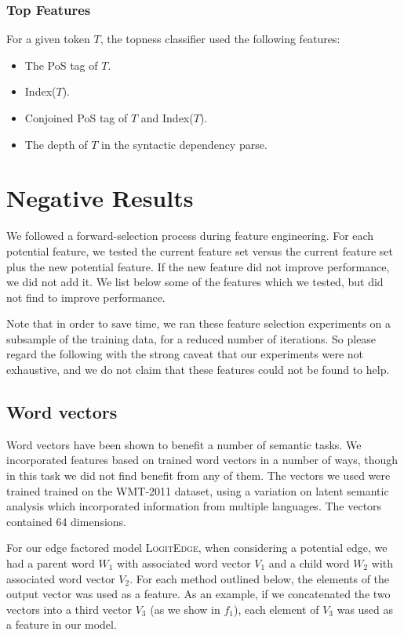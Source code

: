 \documentclass[11pt]{article}
\newcommand{\logitedge}{\textsc{LogitEdge}}
\begin{document}
\subsubsection{Top Features}
For a given token $T$, the topness classifier used the following features:
\begin{itemize}
\item The PoS tag of $T$.
\item Index($T$).
\item Conjoined PoS tag of $T$ and Index($T$).
\item The depth of $T$ in the syntactic dependency parse. 
\end{itemize}






\section{Negative Results} \label{s:negative}

We followed a forward-selection process during feature engineering.
For each potential feature, we tested the current feature set versus the current
feature set plus the new potential feature.
If the new feature did not improve performance, we did not add it.
We list below some of the features which we tested, but did not find to improve
performance.

Note that in order to save time, we ran these feature selection experiments
on a subsample of the training data, for a reduced number of iterations.
So please regard the following with the strong caveat that our experiments were
not exhaustive, and we do not claim that these features could not be found to
help.

\subsection{Word vectors}
Word vectors have been shown to benefit a number of semantic tasks. We
incorporated features based on trained word vectors in a number of ways, though
in this task we did not find benefit from any of them.
The vectors we used \cite{wordVectors} were trained trained on the WMT-2011
dataset, using a variation on latent semantic analysis which incorporated
information from multiple languages.
The vectors contained 64 dimensions.

For our edge factored model \logitedge, when considering a potential edge, we
had a parent word $W_1$ with associated word vector $V_1$ and a child word
$W_2$ with associated word vector $V_2$.
For each method outlined below, the elements of the output vector was used as a
feature.
As an example, if we concatenated the two vectors into a third vector $V_3$ (as
we show in $f_1$), each element of $V_3$ was used as a feature in our model.
\end{document}
